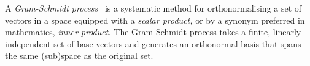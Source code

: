 A {\em Gram-Schmidt process}~\cite{Leon-MR3054730}
is a systematic method for orthonormalising a set of vectors
in a space equipped with a {\em scalar product,}
or by a synonym preferred in mathematics, {\em inner product.}
The Gram-Schmidt process takes a finite, linearly independent set
of base vectors
and generates an orthonormal basis that spans the same (sub)space as the original set.

